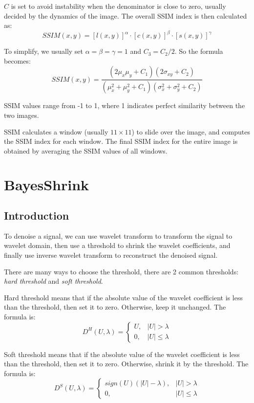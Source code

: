 \documentclass[10pt,a4paper,oneside,numbers=noenddot]{scrbook}
\theoremstyle{ctplain}
\theoremstyle{ctresult}
\begin{document}
$C$ is set to avoid instability when the denominator is close to zero, usually decided by
the dynamics of the image. The overall SSIM index is then calculated as:
\[
  SSIM(x,y) = [l(x,y)]^\alpha \cdot [c(x,y)]^\beta \cdot [s(x,y)]^\gamma
\]

To simplify, we usually set $\alpha = \beta = \gamma = 1$ and $C_3 = C_2/2$. So the formula
becomes:
\[
  SSIM(x,y) = \frac{(2\mu_x \mu_y + C_1)(2\sigma_{xy} + C_2)}{(\mu_x^2 + \mu_y^2 + C_1)
  (\sigma_x^2 + \sigma_y^2 + C_2)}
\]

SSIM values range from -1 to 1, where 1 indicates perfect similarity between the two images.

SSIM calculates a window (usually $11 \times 11$) to slide over the image, and
computes the SSIM index for each window. The final SSIM index for the entire image
is obtained by averaging the SSIM values of all windows.

\section{BayesShrink}
\subsection{Introduction}

To denoise a signal, we can use wavelet transform to transform the signal to wavelet
domain, then use a threshold to shrink the wavelet coefficients, and finally use inverse
wavelet transform to reconstruct the denoised signal.

There are many ways to choose the threshold, there are 2 common thresholds: \emph{hard
threshold} and \emph{soft threshold}.

Hard threshold means that if the absolute value of the wavelet coefficient is less than the
threshold, then set it to zero. Otherwise, keep it unchanged. The formula is:
\[
  D^H(U, \lambda) = \begin{cases}
    U, & |U| > \lambda \\
    0, & |U| \leq \lambda
  \end{cases}
\]

Soft threshold means that if the absolute value of the wavelet coefficient is less than the
threshold, then set it to zero. Otherwise, shrink it by the threshold. The formula is:
\[
  D^S(U, \lambda) = \begin{cases}
    sign(U)(|U| - \lambda), & |U| > \lambda \\
    0, & |U| \leq \lambda
  \end{cases}
\]
\end{document}
